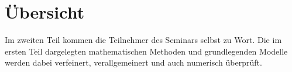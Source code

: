 %
%
%
\chapter*{Übersicht}
\fancyhead[RE]{}
\label{buch:uebersicht}
Im zweiten Teil kommen die Teilnehmer des Seminars selbst zu Wort.
Die im ersten Teil dargelegten mathematischen Methoden und
grundlegenden Modelle werden dabei verfeinert, verallgemeinert
und auch numerisch überprüft.









